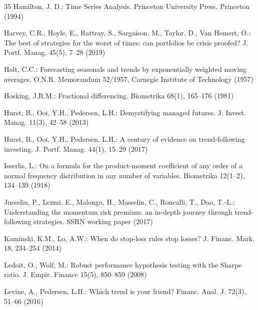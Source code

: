 \documentclass[hidelinks]{siamonline250211}
\begin{document}
\begin{thebibliography}{35}
	 Hamilton, J. D.: Time Series Analysis. Princeton University Press, Princeton (1994)
	
	 Harvey, C.R., Hoyle, E., Rattray, S., Sargaison, M., Taylor, D., Van Hemert, O.: The best of strategies for the worst of times: can portfolios be crisis proofed? J. Portf. Manag. 45(5), 7--28 (2019)
	
	 Holt, C.C.: Forecasting seasonals and trends by exponentially weighted moving averages. O.N.R. Memorandum 52/1957, Carnegie Institute of Technology (1957)
	
	 Hosking, J.R.M.: Fractional differencing. Biometrika 68(1), 165--176 (1981)
	
	 Hurst, B., Ooi, Y.H., Pedersen, L.H.: Demystifying managed futures. J. Invest. Manag. 11(3), 42--58 (2013)
	
	 Hurst, B., Ooi, Y.H., Pedersen, L.H.: A century of evidence on trend-following investing. J. Portf. Manag. 44(1), 15--29 (2017)
	
	 Isserlis, L.: On a formula for the product-moment coefficient of any order of a normal frequency distribution in any number of variables. Biometrika 12(1--2), 134--139 (1918)
	
	 Jusselin, P., Lezmi, E., Malongo, H., Masselin, C., Roncalli, T., Dao, T.-L.: Understanding the momentum risk premium: an in-depth journey through trend-following strategies. SSRN working paper (2017)
	
	 Kaminski, K.M., Lo, A.W.: When do stop-loss rules stop losses? J. Financ. Mark. 18, 234--254 (2014)
	
	 Ledoit, O., Wolf, M.: Robust performance hypothesis testing with the Sharpe ratio. J. Empir. Finance 15(5), 850--859 (2008)
	
	 Levine, A., Pedersen, L.H.: Which trend is your friend? Financ. Anal. J. 72(3), 51--66 (2016)
	

\end{thebibliography}
\end{document}
